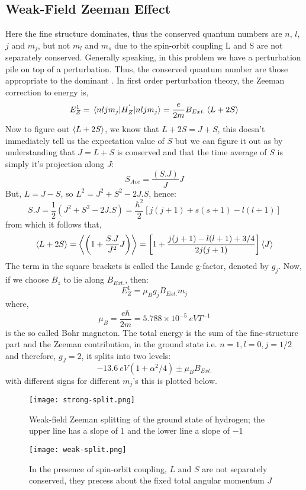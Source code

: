 \subsection{Weak-Field Zeeman Effect}
Here the fine structure dominates, thus the conserved quantum numbers are $n$, $l$, $j$ and $m_{j}$, but not $m_{l}$ and $m_{s}$ due to the spin-orbit coupling L and S are not separately conserved. Generally speaking, in this problem we have a perturbation pile on top of a perturbation. Thus, the conserved quantum number are those appropriate to the dominant . In first order perturbation theory, the Zeeman correction to energy is,
\begin{equation}
E^{1}_{Z} = \expval{H^{'}_{Z}}{nlj m_{j}} = \frac{e}{2m}B_{Ext.} \expval{L + 2S}
\end{equation} 
Now to figure out $\expval{L + 2S}$, we know that $L + 2S = J + S$, this doesn't immediately tell us the expectation value of $S$ but we can figure it out as by understanding that $J = L + S$ is conserved and that the time average of $S$ is simply it's projection along $J$:
\begin{equation}
	S_{Ave} = \frac{(S.J)}{J}J
\end{equation}
But, $L = J - S$, so  $L^{2} = J^{2} + S^{2} - 2 J.S$, hence:
\begin{equation}
S.J = \frac{1}{2}(J^{2} + S^{2} - 2 J.S) = \frac{\hbar^{2}}{2}[j(j+1)+ s(s+1)-l(l+1)]
\end{equation}
from which it follows that,
\begin{equation}
	\expval{L + 2S} = \expval{\left(1 + \frac{S.J}{J^{2}}J\right)} = \left[1 + \frac{j(j+1)-l(l+1) + 3/4}{2j(j+1)}\right]\expval{J}
\end{equation}
The term in the square brackets is called the Lande g-factor, denoted by $g_{j}$. Now, if we choose $B_{z}$ to lie along $B_{Ext.}$, then:
\begin{equation}
	E^{1}_{Z} = \mu_{B} g_{j} B_{Ext.} m_{j}
\end{equation}
where,
$$\mu_{B} = \frac{e \hbar}{2m} = 5.788 \times 10^{-5} \ eVT^{-1}$$
is the so called Bohr magneton. The total energy is the sum of the fine-structure part and the Zeeman contribution, in the ground state i.e. $n = 1, l = 0, j = 1/2$ and therefore, $g_{J} = 2$, it splits into two levels:
\begin{equation}
	-13.6 \ eV(1 + \alpha^{2}/4) \pm \mu_{B} B_{Ext.}
\end{equation}
with different signs for different $m_{j}$'s this is plotted below.
\begin{figure}[h]
	\centering
	\texttt{[image: strong-split.png]}
	\caption{Weak-field Zeeman splitting of the ground state of hydrogen; the upper line has a slope of $1$ and the lower line a slope of $-1$}
\end{figure}
\begin{figure}[h]
	\centering
	\texttt{[image: weak-split.png]}
	\caption{In the presence of spin-orbit coupling, $L$ and $S$ are not separately conserved, they precess about the fixed total angular momentum $J$}
\end{figure}
